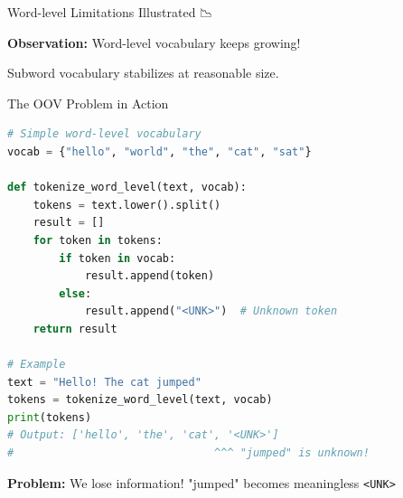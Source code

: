 \documentclass[aspectratio=169]{beamer}
\begin{document}
\begin{frame}[shrink=5]{Word-level Limitations Illustrated 📉}
    \begin{center}
    \end{center}

    \vspace{0.5em}
    \textbf{Observation:} Word-level vocabulary keeps growing!

    Subword vocabulary stabilizes at reasonable size.
\end{frame}

\begin{frame}[fragile]{The OOV Problem in Action 🚨}
    \begin{lstlisting}[language=Python]
# Simple word-level vocabulary
vocab = {"hello", "world", "the", "cat", "sat"}

def tokenize_word_level(text, vocab):
    tokens = text.lower().split()
    result = []
    for token in tokens:
        if token in vocab:
            result.append(token)
        else:
            result.append("<UNK>")  # Unknown token
    return result

# Example
text = "Hello! The cat jumped"
tokens = tokenize_word_level(text, vocab)
print(tokens)
# Output: ['hello', 'the', 'cat', '<UNK>']
#                               ^^^ "jumped" is unknown!
    \end{lstlisting}

    \textbf{Problem:} We lose information! "jumped" becomes meaningless \texttt{<UNK>}
\end{frame}
\end{document}

